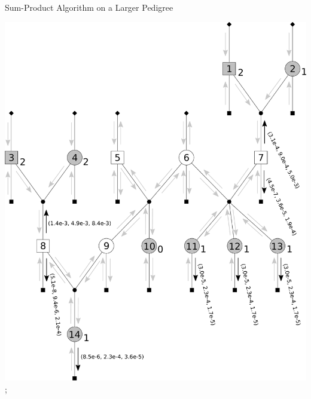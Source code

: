 \documentclass[letter,graphicx]{beamer}
\begin{document}
\begin{frame}{Sum-Product Algorithm on a Larger Pedigree} 
\begin{center} 
\includegraphics[height = 0.8\textheight]{./images/mg-example-step10.pdf}; 
\end{center}
\end{frame}
\end{document}
